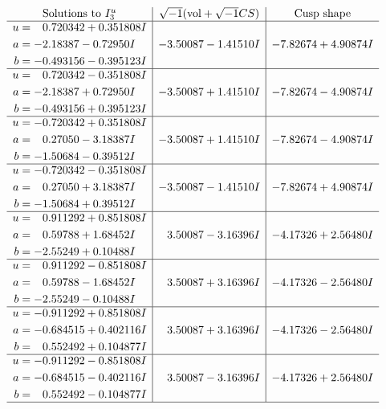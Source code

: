 \documentclass[1p]{elsarticle_modified}
\theoremstyle{definition}
\newcommand{\I}{\sqrt{-1}}
\begin{document}
$$\begin{array}{c|c|c}  
\text{Solutions to }I^u_{3}& \I (\text{vol} + \sqrt{-1}CS) & \text{Cusp shape}\\
 \hline 
\begin{aligned}
u &= \phantom{-}0.720342 + 0.351808 I \\
a &= -2.18387 - 0.72950 I \\
b &= -0.493156 - 0.395123 I\end{aligned}
 & -3.50087 - 1.41510 I & -7.82674 + 4.90874 I \\ \hline\begin{aligned}
u &= \phantom{-}0.720342 - 0.351808 I \\
a &= -2.18387 + 0.72950 I \\
b &= -0.493156 + 0.395123 I\end{aligned}
 & -3.50087 + 1.41510 I & -7.82674 - 4.90874 I \\ \hline\begin{aligned}
u &= -0.720342 + 0.351808 I \\
a &= \phantom{-}0.27050 - 3.18387 I \\
b &= -1.50684 - 0.39512 I\end{aligned}
 & -3.50087 + 1.41510 I & -7.82674 - 4.90874 I \\ \hline\begin{aligned}
u &= -0.720342 - 0.351808 I \\
a &= \phantom{-}0.27050 + 3.18387 I \\
b &= -1.50684 + 0.39512 I\end{aligned}
 & -3.50087 - 1.41510 I & -7.82674 + 4.90874 I \\ \hline\begin{aligned}
u &= \phantom{-}0.911292 + 0.851808 I \\
a &= \phantom{-}0.59788 + 1.68452 I \\
b &= -2.55249 + 0.10488 I\end{aligned}
 & \phantom{-}3.50087 - 3.16396 I & -4.17326 + 2.56480 I \\ \hline\begin{aligned}
u &= \phantom{-}0.911292 - 0.851808 I \\
a &= \phantom{-}0.59788 - 1.68452 I \\
b &= -2.55249 - 0.10488 I\end{aligned}
 & \phantom{-}3.50087 + 3.16396 I & -4.17326 - 2.56480 I \\ \hline\begin{aligned}
u &= -0.911292 + 0.851808 I \\
a &= -0.684515 + 0.402116 I \\
b &= \phantom{-}0.552492 + 0.104877 I\end{aligned}
 & \phantom{-}3.50087 + 3.16396 I & -4.17326 - 2.56480 I \\ \hline\begin{aligned}
u &= -0.911292 - 0.851808 I \\
a &= -0.684515 - 0.402116 I \\
b &= \phantom{-}0.552492 - 0.104877 I\end{aligned}
 & \phantom{-}3.50087 - 3.16396 I & -4.17326 + 2.56480 I\\
 \hline 
 \end{array}$$\newpage
\end{document}
